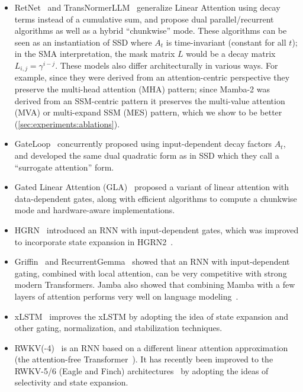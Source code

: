 \begin{itemize}[leftmargin=*,itemsep=0pt,topsep=0pt]
  \item RetNet~\citep{sun2023retentive} and TransNormerLLM~\citep{qin2023transnormerllm} generalize Linear Attention using decay terms instead of a cumulative sum, and propose dual parallel/recurrent algorithms as well as a hybrid ``chunkwise'' mode. These algorithms can be seen as an instantiation of SSD where $A_t$ is time-invariant (constant for all $t$); in the SMA interpretation, the mask matrix $L$ would be a decay matrix $L_{i,j} = \gamma^{i-j}$.
    These models also differ architecturally in various ways. For example, since they were derived from an attention-centric perspective they preserve the multi-head attention (MHA) pattern; since Mamba-2 was derived from an SSM-centric pattern it preserves the multi-value attention (MVA) or multi-expand SSM (MES) pattern, which we show to be better (\ref{sec:experiments:ablations}).

  \item GateLoop~\citep{katsch2023gateloop} concurrently proposed using input-dependent decay factors $A_t$, and developed the same dual quadratic form as in SSD which they call a ``surrogate attention'' form.

  \item Gated Linear Attention (GLA)~\citep{yang2024gated} proposed a variant of linear attention with data-dependent gates, along with efficient algorithms to compute a chunkwise mode and hardware-aware implementations.

  \item HGRN~\citep{qin2023hierarchically} introduced an RNN with input-dependent gates, which was improved to incorporate state expansion in HGRN2~\citep{qin2024hgrn2}.

  \item Griffin~\citep{de2024griffin} and RecurrentGemma~\citep{botev2024recurrentgemma} showed that an RNN with input-dependent gating, combined with local attention, can be very competitive with strong modern Transformers. Jamba also showed that combining Mamba with a few layers of attention performs very well on language modeling~\citep{lieber2024jamba}.

  \item xLSTM~\citep{beck2024xlstm} improves the xLSTM by adopting the idea of state expansion and other gating, normalization, and stabilization techniques.

  \item RWKV(-4)~\citep{peng2023rwkv} is an RNN based on a different linear attention approximation (the attention-free Transformer~\citep{zhai2021attention}).
    It has recently been improved to the RWKV-5/6 (Eagle and Finch) architectures~\citep{peng2024eagle} by adopting the ideas of selectivity and state expansion.
\end{itemize}

